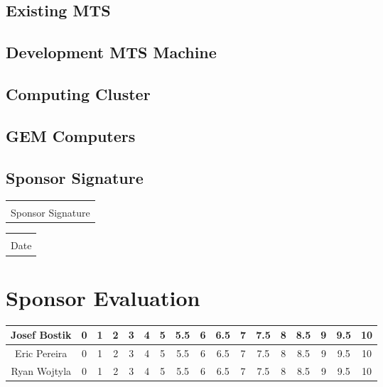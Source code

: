\documentclass[12pt]{article}
\makeatletter
\newcommand{\titledate}[2][2.5in]{%
	\noindent%
	\begin{tabular}{@{}p{#1}@{}}
		\\ \hline \\[-.75\normalbaselineskip]
		#2
	\end{tabular} \hspace{1in}
	\begin{tabular}{@{}p{#1}@{}}
		\\ \hline \\[-.75\normalbaselineskip]
		Date
	\end{tabular}
}
\makeatother
\begin{document}
\subsection{Existing MTS}

\vspace{1in}

\subsection{Development MTS Machine}

\vspace{1in}

\subsection{Computing Cluster}

\vspace{1in}

\subsection{GEM Computers}

\vspace{1in}

\newpage

\subsection{Sponsor Signature}
\vspace{.5in}
 \titledate{Sponsor Signature}
 
\section{Sponsor Evaluation}
\begin{tabular}{|c|c|c|c|c|c|c|c|c|c|c|c|c|c|c|c|c|}
	\hline
	Josef Bostik & 0 & 1 & 2 & 3 & 4 & 5 & 5.5 & 6 & 6.5 & 7 & 7.5 & 8 & 8.5 & 9 & 9.5 & 10\\
	\hline
	Eric Pereira & 0 & 1 & 2 & 3 & 4 & 5 & 5.5 & 6 & 6.5 & 7 & 7.5 & 8 & 8.5 & 9 & 9.5 & 10\\
	\hline
	Ryan Wojtyla & 0 & 1 & 2 & 3 & 4 & 5 & 5.5 & 6 & 6.5 & 7 & 7.5 & 8 & 8.5 & 9 & 9.5 & 10\\
	\hline
\end{tabular}
\end{document}
